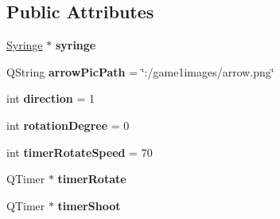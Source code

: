 \subsection*{Public Attributes}
\begin{DoxyCompactItemize}
\item 
\hypertarget{classArrow_a5d650c3a3f32e195073714a842cb3ba1}{\hyperlink{classSyringe}{Syringe} $\ast$ {\bfseries syringe}}\label{classArrow_a5d650c3a3f32e195073714a842cb3ba1}

\item 
\hypertarget{classArrow_aa1e4a50a3af88811647d567281d7282f}{Q\-String {\bfseries arrow\-Pic\-Path} = \char`\"{}\-:/game1images/arrow.\-png\char`\"{}}\label{classArrow_aa1e4a50a3af88811647d567281d7282f}

\item 
\hypertarget{classArrow_a432a155342e15549f6a75cf356a5690e}{int {\bfseries direction} = 1}\label{classArrow_a432a155342e15549f6a75cf356a5690e}

\item 
\hypertarget{classArrow_a8d597a253d5a00895021d7bac39e600c}{int {\bfseries rotation\-Degree} = 0}\label{classArrow_a8d597a253d5a00895021d7bac39e600c}

\item 
\hypertarget{classArrow_ae2a16d546410f236d613092aa9f468a8}{int {\bfseries timer\-Rotate\-Speed} = 70}\label{classArrow_ae2a16d546410f236d613092aa9f468a8}

\item 
\hypertarget{classArrow_a5599f9641e83d7eafb79eaf27867aca3}{Q\-Timer $\ast$ {\bfseries timer\-Rotate}}\label{classArrow_a5599f9641e83d7eafb79eaf27867aca3}

\item 
\hypertarget{classArrow_a429a6c14c3ac03613eb705f83cabf25a}{Q\-Timer $\ast$ {\bfseries timer\-Shoot}}\label{classArrow_a429a6c14c3ac03613eb705f83cabf25a}

\end{DoxyCompactItemize}


